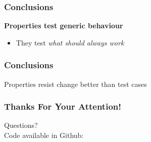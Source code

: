 \documentclass[xcolor=dvipsnames]{beamer}
\begin{document}
\begin{frame}
  \frametitle{Conclusions}

  \textbf{Properties test generic behaviour}
  \begin{itemize}
  \item They test \textit{what should always work}
  \end{itemize}
\end{frame}

\begin{frame}
  \frametitle{Conclusions}

  \begin{center}
    {\huge Properties resist change better than test cases}
  \end{center}
\end{frame}


\begin{frame}
  \frametitle{Thanks For Your Attention!}
  \begin{center}
    \huge{Questions?}\\
    \vspace{1cm}
    \normalsize
    Code available in Github: \color{blue}{http://github.com/lambdastream/tdd\_template}
  \end{center}
\end{frame}

\begin{frame}
  \titlepage
\end{frame}
\end{document}
